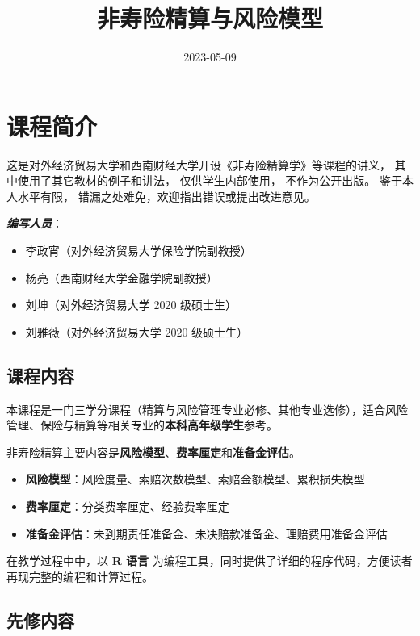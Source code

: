 \documentclass[
]{book}
\title{非寿险精算与风险模型}
\author{}
\date{\vspace{-2.5em}2023-05-09}
\providecommand{\tightlist}{%
  \setlength{\itemsep}{0pt}\setlength{\parskip}{0pt}}
\begin{document}
\maketitle

{
\setcounter{tocdepth}{1}
\tableofcontents
}
\hypertarget{prep}{%
\chapter{课程简介}\label{prep}}

这是对外经济贸易大学和西南财经大学开设《非寿险精算学》等课程的讲义， 其中使用了其它教材的例子和讲法， 仅供学生内部使用， 不作为公开出版。 鉴于本人水平有限， 错漏之处难免，欢迎指出错误或提出改进意见。

\textbf{\emph{编写人员}}：

\begin{itemize}
\item
  李政宵（对外经济贸易大学保险学院副教授）
\item
  杨亮（西南财经大学金融学院副教授）
\item
  刘坤（对外经济贸易大学 2020 级硕士生）
\item
  刘雅薇（对外经济贸易大学 2020 级硕士生）
\end{itemize}

\hypertarget{ux8bfeux7a0bux5185ux5bb9}{%
\section{课程内容}\label{ux8bfeux7a0bux5185ux5bb9}}

本课程是一门三学分课程（精算与风险管理专业必修、其他专业选修），适合风险管理、保险与精算等相关专业的\textbf{本科高年级学生}参考。

非寿险精算主要内容是\textbf{风险模型}、\textbf{费率厘定}和\textbf{准备金评估}。

\begin{itemize}
\tightlist
\item
  \textbf{风险模型}：风险度量、索赔次数模型、索赔金额模型、累积损失模型
\item
  \textbf{费率厘定}：分类费率厘定、经验费率厘定
\item
  \textbf{准备金评估}：未到期责任准备金、未决赔款准备金、理赔费用准备金评估
\end{itemize}

在教学过程中中，以 \textbf{R 语言} 为编程工具，同时提供了详细的程序代码，方便读者再现完整的编程和计算过程。

\hypertarget{ux5148ux4feeux5185ux5bb9}{%
\section{先修内容}\label{ux5148ux4feeux5185ux5bb9}}
\end{document}
